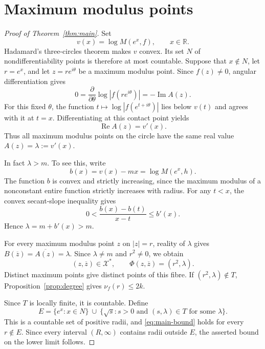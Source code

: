 \documentclass[11pt]{article}
\theoremstyle{remark}
\numberwithin{equation}{section}
\newcommand{\R}{\mathbb R}
\newcommand{\X}{\mathcal X}
\begin{document}
\section{Maximum modulus points}\label{sec:maxima}

\begin{proof}[Proof of Theorem~\ref{thm:main}]
Set
\[
 v(x)=\log M(e^x,f),\qquad x\in\R.
\]
Hadamard's three-circles theorem makes \(v\) convex.
Its set \(N\) of nondifferentiability points is therefore at most
countable.
Suppose that \(x\notin N\), let \(r=e^x\), and let
\(z=re^{i\theta}\) be a maximum modulus point.
Since \(f(z)\ne0\), angular differentiation gives
\begin{equation}\label{eq:angular}
 0=\frac{\partial}{\partial\theta}\log|f(re^{i\theta})|
 =-\operatorname{Im}A(z).
\end{equation}
For this fixed \(\theta\), the function
\(t\mapsto\log|f(e^{t+i\theta})|\) lies below \(v(t)\) and agrees
with it at \(t=x\). Differentiating at this contact point yields
\begin{equation}\label{eq:radial}
 \operatorname{Re}A(z)=v'(x).
\end{equation}
Thus all maximum modulus points on the circle have the same real
value \(A(z)=\lambda:=v'(x)\).

In fact \(\lambda>m\).
To see this, write
\[
 b(x)=v(x)-mx=\log M(e^x,h).
\]
The function \(b\) is convex and strictly increasing, since the maximum
modulus of a nonconstant entire function strictly increases with radius.
For any \(t<x\), the convex secant-slope inequality gives
\[
 0<\frac{b(x)-b(t)}{x-t}\le b'(x).
\]
Hence \(\lambda=m+b'(x)>m\).

For every maximum modulus point \(z\) on \(|z|=r\), reality of
\(\lambda\) gives \(B(\overline z)=\overline{A(z)}=\lambda\).
Since \(\lambda\ne m\) and \(r^2\ne0\), we obtain
\begin{equation}\label{eq:maximal-fibre}
 (z,\overline z)\in\X^*,
 \qquad\Phi(z,\overline z)=(r^2,\lambda).
\end{equation}
Distinct maximum points give distinct points of this fibre.
If \((r^2,\lambda)\notin T\), Proposition~\ref{prop:degree} gives
\(\nu_f(r)\le2k\).

Since \(T\) is locally finite, it is countable. Define
\[
 E=\{e^x:x\in N\}\ \cup\
   \{\sqrt{s}:s>0\text{ and }(s,\lambda)\in T
      \text{ for some }\lambda\}.
\]
This is a countable set of positive radii, and
\eqref{eq:main-bound} holds for every \(r\notin E\).
Since every interval \((R,\infty)\) contains radii outside \(E\),
the asserted bound on the lower limit follows.
\end{proof}
\end{document}
